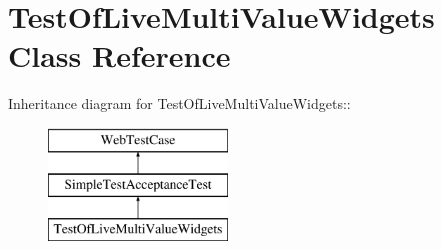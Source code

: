 \hypertarget{class_test_of_live_multi_value_widgets}{
\section{TestOfLiveMultiValueWidgets Class Reference}
\label{class_test_of_live_multi_value_widgets}
}
Inheritance diagram for TestOfLiveMultiValueWidgets::\begin{figure}[H]
\begin{center}
\leavevmode
\includegraphics[height=3cm]{class_test_of_live_multi_value_widgets}
\end{center}
\end{figure}
